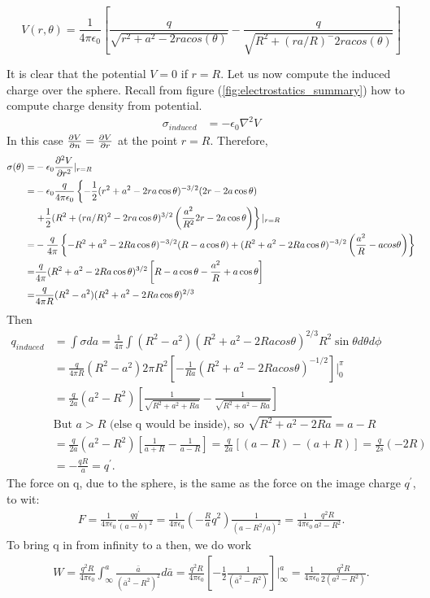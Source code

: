 \begin{equation}
	V(r,\theta) = \frac{1}{4\pi\epsilon_0} 
	\left[
	\frac{q}{\sqrt{r^2+a^2-2ra cos(\theta)}} - 
	\frac{q}{\sqrt{R^2+(ra/R)^-2ra cos(\theta)}}
	\right]
\end{equation}

It is clear that the potential $V=0$ if $r=R$. Let us now compute the induced charge over the sphere. Recall from figure (\ref{fig:electrostatics_summary}) how to compute charge density from potential.
\begin{align*}
	\sigma_{induced} &= -\epsilon_0 \nabla^2{V} 
\end{align*}
In this case $\frac{\partial V}{\partial n}=\frac{\partial V}{\partial r}$ at the point $r=R$. Therefore,
\begin{align*}
	\sigma(\theta) = &-\epsilon_0 \frac{\partial^2 V}{\partial r^2}|_{r=R}\\
	 	= &-\epsilon_0 \frac{q}{4\pi\epsilon_0} 
		\left\{
			-\frac{1}{2}(r^2+a^2-2ra\cos\theta)^{-3/2}(2r-2a\cos\theta) 
		\right. \\
		&\left.
			+\frac{1}{2}(R^2+(ra/R)^2-2ra\cos\theta)^{3/2}
			\left( \frac{a^2}{R^2}2r-2a\cos\theta \right)
		\right\}|_{r=R} \\
		= &-\frac{q}{4\pi} \left\{ -R^2+a^2-2Ra\cos\theta)^{-3/2} (R-a\cos\theta)+
		(R^2+a^2-2Ra\cos\theta)^{-3/2} \left( \frac{a^2}{R}-acos\theta \right)\right\} \\
		= &\frac{q}{4\pi}(R^2+a^2-2Ra\cos\theta)^{3/2}
		\left[ R-a\cos\theta -\frac{a^2}{R}+a\cos\theta \right] \\
		= &\frac{q}{4\pi R}(R^2-a^2)(R^2+a^2-2Ra\cos\theta)^{2/3}
\end{align*}
Then 
\begin{align*}
q_{induced} &= \int \sigma da 
			= \frac{1}{4\pi} \int(R^2-a^2)(R^2+a^2-2Ra cos\theta)^{2/3}R^2 \sin\theta d\theta d\phi\\
			&= \frac{q}{4\pi R}(R^2-a^2)2\pi R^2 \left[ -\frac{1}{Ra}(R^2+a^2-2Ra cos\theta)^{-1/2} \right]|_0^\pi\\
			&= \frac{q}{2a}(a^2-R^2)\left[ \frac{1}{\sqrt{R^2+a^2+Ra}}-\frac{1}{\sqrt{R^2+a^2-Ra}}\right]\\
			&\text{But $a>R$ (else q would be inside), so } \sqrt{R^2+a^2-2Ra}=a-R \\
			&= \frac{q}{2a}(a^2-R^2)\left[\frac{1}{a+R}-\frac{1}{a-R} \right] = \frac{q}{2a}[(a-R)-(a+R)]=\frac{q}{2s}(-2R)\\
			&= -\frac{qR}{a} = q^\prime.
\end{align*}
The force on q, due to the sphere, is the same as the force on the image charge $q^\prime$, to wit:
\begin{align*}
	F = \frac{1}{4\pi\epsilon_0} \frac{qq^\prime}{(a-b)^2}=\frac{1}{4\pi\epsilon_0}
	\left( -\frac{R}{a}q^2 	\right)\frac{1}{(a-R^2/a)^2}
	=\frac{1}{4\pi\epsilon_0} \frac{q^2R}{a^2-R^2}.
\end{align*}
To bring q in from infinity to a then, we do work
\begin{align*}
	W = \frac{q^2R}{4\pi\epsilon_0}\int_\infty^a \frac{\bar{a}}{(\bar{a}^2-R^2)^2} d\bar{a}
	=\frac{q^2R}{4\pi\epsilon_0}\left[ -\frac{1}{2} \frac{1}{(\bar{a}^2-R^2)} \right]|_\infty^a = \frac{1}{4\pi\epsilon_0} \frac{q^2R}{2(a^2-R^2)}.
\end{align*}

